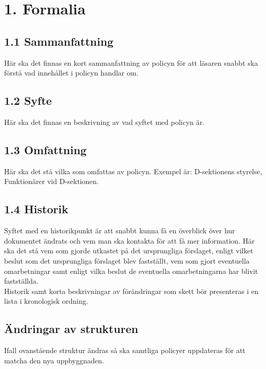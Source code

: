 \documentclass[]{dsekprotokoll}
\begin{document}
\hfill\begin{minipage}{\dimexpr\textwidth-3cm}
    \xdef\tpd{\the\prevdepth}
    \section*{1. Formalia}
    \subsection*{1.1 Sammanfattning}
    Här ska det finnas en kort sammanfattning av policyn för att läsaren
    snabbt ska förstå vad innehållet i policyn handlar om. \\

    \subsection*{1.2 Syfte}
    Här ska det finnas en beskrivning av vad syftet med policyn är. \\

    \subsection*{1.3 Omfattning}
    Här ska det stå vilka som omfattas av policyn. Exempel är: D-sektionens styrelse, Funktionärer vid D-sektionen.\\

    \subsection*{1.4 Historik}
    Syftet med en historikpunkt är att snabbt kunna få en överblick över hur
    dokumentet ändrats och vem man ska kontakta för att få mer
    information. Här ska det stå vem som gjorde utkastet på det ursprungliga
    förslaget, enligt vilket beslut som det ursprungliga förslaget blev fastställt, vem som gjort eventuella omarbetningar samt enligt vilka beslut de
    eventuella omarbetningarna har blivit fastställda.
    \\

    Historik samt korta beskrivningar av förändringar som skett bör presenteras i en lista i kronologisk ordning. \\
\end{minipage}

\prevdepth\tpd

\subsection{Ändringar av strukturen}
Ifall ovanstående struktur ändras så ska samtliga policyer uppdateras för att matcha den nya uppbyggnaden.
\end{document}
